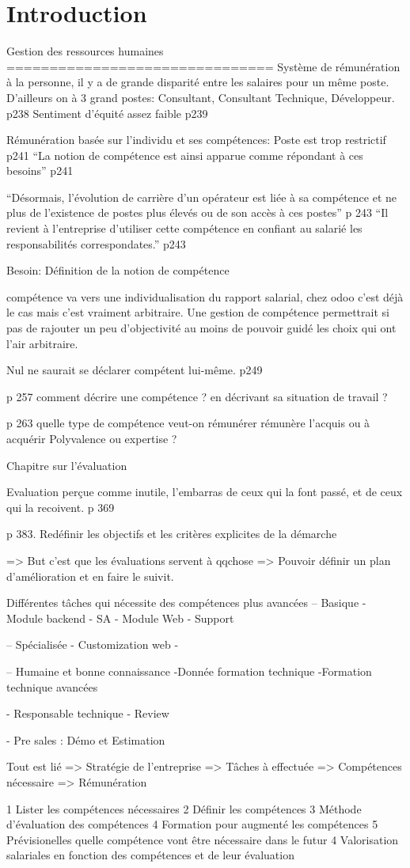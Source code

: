 \chapter*{Introduction}


Gestion des ressources humaines
===============================
Système de rémunération à la personne, il y a de grande disparité entre les salaires pour un même poste. D'ailleurs on à 3 grand postes: Consultant, Consultant Technique, Développeur. p238
Sentiment d'équité assez faible p239

Rémunération basée sur l'individu et ses compétences: Poste est trop restrictif p241
``La notion de compétence est ainsi apparue comme répondant à ces besoins'' p241

``Désormais, l'évolution de carrière d'un opérateur est liée à sa compétence et ne plus de l'existence de postes plus élevés ou de son accès à ces postes'' p 243
``Il revient à l'entreprise d'utiliser cette compétence en confiant au salarié les responsabilités correspondates.'' p243



Besoin: Définition de la notion de compétence


compétence va vers une individualisation du rapport salarial, chez odoo c'est déjà le cas mais c'est vraiment arbitraire. Une gestion de compétence permettrait si pas de rajouter un peu d'objectivité au moins de pouvoir guidé les choix qui ont l'air arbitraire. 


Nul ne saurait se déclarer compétent lui-même. p249

p 257 comment décrire une compétence ? en décrivant sa situation de travail ? 

p 263 quelle type de compétence veut-on rémunérer
rémunère l'acquis ou à acquérir
Polyvalence ou expertise ? 

Chapitre sur l'évaluation

Evaluation perçue comme inutile, l'embarras de ceux qui la font passé, et de ceux qui la recoivent. p 369

p 383. Redéfinir les objectifs et les critères explicites de la démarche

=> But c'est que les évaluations servent à qqchose
=> Pouvoir définir un plan d'amélioration et en faire le suivit.


Différentes tâches qui nécessite des compétences plus avancées
-- Basique
- Module backend
- SA
- Module Web
- Support

-- Spécialisée
- Customization web 
- 


-- Humaine et bonne connaissance
-Donnée formation technique
-Formation technique avancées

- Responsable technique
- Review

- Pre sales : Démo et Estimation


Tout est lié => Stratégie de l'entreprise => Tâches à effectuée => Compétences nécessaire => Rémunération


1 Lister les compétences nécessaires
2 Définir les compétences 
3 Méthode d'évaluation des compétences
4 Formation pour augmenté les compétences
5 Prévisionelles quelle compétence vont être nécessaire dans le futur
4 Valorisation salariales en fonction des compétences et de leur évaluation
